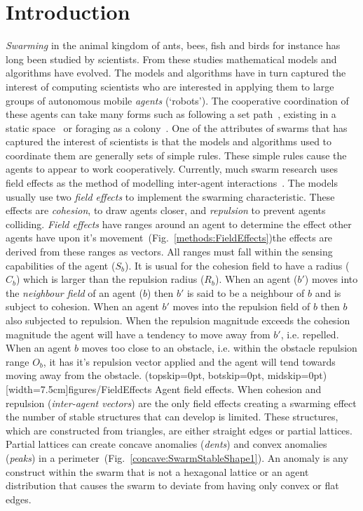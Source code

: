 \documentclass{ieeeaccess}
\begin{document}
\section{Introduction}\label{sec:ConcaveReduction}
\textit{Swarming} in the animal kingdom of ants, bees, fish and birds for instance has long been studied by scientists. From these studies mathematical models and algorithms have evolved. The models and algorithms have in turn captured the interest of computing scientists who are interested in applying them to large groups of autonomous mobile \textit{agents} (`robots'). The cooperative coordination of these agents can take many forms such as following a set path~\cite{HCS:09}, existing in a static space~\cite{EP:10, GP:02, GP:04} or foraging as a colony~\cite{HER:11, GK:07}. One of the attributes of swarms that has captured the interest of scientists is that the models and algorithms used to coordinate them are generally sets of simple rules. These simple rules cause the agents to appear to work cooperatively.
Currently, much swarm research uses field effects as the method of modelling inter-agent interactions~\cite{BAF:06, BAFVM:06, BM:09, APZDAMC:09, GP:02, GP:04, GP:04a, GP:05, GP:11, MYP:09}. The models usually use two \textit{field effects} to implement the swarming characteristic. These effects are \textit{cohesion}, to draw agents closer, and \textit{repulsion} to prevent agents colliding. \textit{Field effects} have ranges around an agent to determine the effect other agents have upon it's movement~(Fig.~\ref{methods:FieldEffects})the effects are derived from these ranges as vectors. All ranges must fall within the sensing capabilities of the agent ($S_b$). It is usual for the cohesion field to have a radius ($C_b$) which is larger than the repulsion radius ($R_b$). When an agent ($b'$) moves into the \textit{neighbour field} of an agent ($b$) then $b'$ is said to be a neighbour of $b$ and is subject to cohesion. When an agent $b'$ moves into the repulsion field of $b$ then $b$ also subjected to repulsion. When the repulsion magnitude exceeds the cohesion magnitude the agent will have a tendency to move away from $b'$, i.e. repelled. When an agent $b$ moves too close to an obstacle, i.e. within the obstacle repulsion range $O_b$, it has it's repulsion vector applied and the agent will tend towards moving away from the obstacle.
\Figure[t!](topskip=0pt, botskip=0pt, midskip=0pt)[width=7.5cm]{figures/FieldEffects}
{Agent field effects.\label{methods:FieldEffects}}
When cohesion and repulsion (\textit{inter-agent vectors}) are the only field effects creating a swarming effect the number of stable structures that can develop is limited. These structures, which are constructed from triangles, are either straight edges or partial lattices. Partial lattices can create concave anomalies (\textit{dents}) and convex anomalies (\textit{peaks}) in a perimeter~(Fig.~\ref{concave:SwarmStableShape1}). An anomaly is any construct within the swarm that is not a hexagonal lattice or an agent distribution that causes the swarm to deviate from having only convex or flat edges. 
\end{document}
